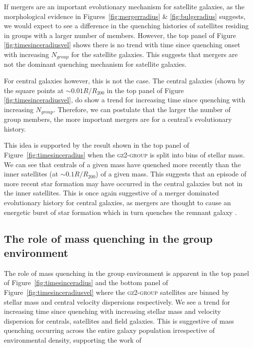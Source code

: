 \documentclass[useAMS,usenatbib]{mn2e}
\begin{document}
If mergers are an important evolutionary mechanism for satellite galaxies, as the morphological evidence in Figures~\ref{fig:mergerradius} \& \ref{fig:bulgeradius} suggests, we would expect to see a difference in the quenching histories of satellites residing in groups with a larger number of members. However, the top panel of Figure \ref{fig:timesinceradiusvel} shows there is no trend with time since quenching onset with increasing $N_{group}$ for the satellite galaxies. This suggests that mergers are not the dominant quenching mechanism for satellite galaxies.

For central galaxies however, this is not the case. The central galaxies (shown by the square points at $\sim 0.01 R/R_{200}$ in the top panel of Figure \ref{fig:timesinceradiusvel}, do show a trend for increasing time since quenching with increasing $N_{group}$. Therefore, we can postulate that the larger the number of group members, the more important mergers are for a central's evolutionary history. 

This idea is supported by the result shown in the top panel of Figure~\ref{fig:timesinceradius} when the \textsc{gz2-group} is split into bins of stellar mass. We can see that centrals of a given mass have quenched more recently than the inner satellites (at $\sim0.1R/R_{200}$) of a given mass. This suggests that an episode of more recent star formation may have occurred in the central galaxies but not in the inner satellites. This is once again suggestive of a merger dominated evolutionary history for central galaxies, as mergers are thought to cause an energetic burst of star formation which in turn quenches the remnant galaxy \citep{hopkins05, treister12, pontzen16}. 


\subsection{The role of mass quenching in the group environment}\label{sec:rolemassenv}

The role of mass quenching in the group environment is apparent in the top panel of Figure~\ref{fig:timesinceradius} and the bottom panel of Figure~\ref{fig:timesinceradiusvel} where the \textsc{gz2-group} satellites are binned by stellar mass and central velocity dispersions respectively. We see a trend for increasing time since quenching with increasing stellar mass and velocity dispersion for centrals, satellites and field galaxies. This is suggestive of mass quenching occurring across the entire galaxy population irrespective of environmental density, supporting the work of \citet{peng10, gabor10, peng12, darvish16}
\end{document}
